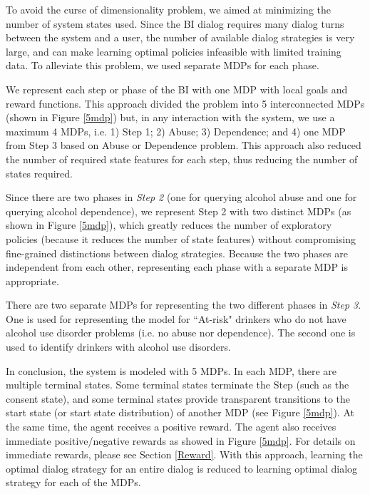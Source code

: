 \begin{sloppy}
To avoid the curse of dimensionality problem, we aimed at minimizing the number of system states used. Since the BI dialog requires many dialog turns between the system and a user, the number of available dialog strategies is very large, and can make learning optimal policies infeasible with limited training data. To alleviate this problem, we used separate MDPs for each phase.

We represent each step or phase of the BI with one MDP with local goals and reward functions. This approach divided the problem into 5 interconnected MDPs (shown in Figure \ref{5mdp}) but, in any interaction with the system, we use a maximum 4 MDPs, i.e. 1) Step 1; 2) Abuse; 3) Dependence; and 4) one MDP from Step 3 based on Abuse or  Dependence problem. This approach also reduced the number of required state features for each step, thus reducing the number of states required. 

Since there are two phases in {\em Step 2} (one for querying alcohol abuse and one for querying alcohol dependence), we represent Step 2 with two distinct MDPs (as shown in Figure \ref{5mdp}), which greatly reduces the number of exploratory policies (because it reduces the number of state features) without compromising fine-grained distinctions between dialog strategies. Because the two phases are independent from each other, representing each phase with a separate MDP is appropriate.
 
There are two separate MDPs for representing the two different phases in {\em Step 3}.  One is used for representing the model for ``At-risk" drinkers who do not have alcohol use disorder problems (i.e. no abuse nor dependence). The second one is used to identify drinkers with alcohol use disorders.

In conclusion, the system is modeled with 5 MDPs. In each MDP, there are multiple terminal states. Some terminal  states  terminate the  Step  (such  as the  consent state), and  some terminal  states  provide  transparent transitions to  the start state  (or start state  distribution) of another MDP (see Figure \ref{5mdp}). %
At the same time, the agent receives a positive reward. The agent also receives immediate positive/negative rewards as showed in Figure \ref{5mdp}. For details on immediate rewards, please see Section \ref{Reward}. With this approach, learning the optimal dialog strategy for an entire dialog is reduced to learning optimal dialog strategy for each of the MDPs. 



\end{sloppy}
